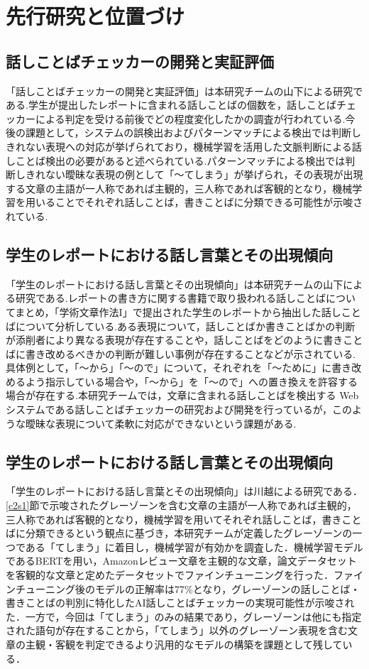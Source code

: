 \chapter{先行研究と位置づけ\label{c2}}

\section{話しことばチェッカーの開発と実証評価 \label{c2s1}}
「話しことばチェッカーの開発と実証評価」は本研究チームの山下による研究である.学生が提出したレポートに含まれる話しことばの個数を，話しことばチェッカーによる判定を受ける前後でどの程度変化したかの調査が行われている.今後の課題として，システムの誤検出およびパターンマッチによる検出では判断しきれない表現への対応が挙げられており，機械学習を活用した文脈判断による話しことば検出の必要があると述べられている.パターンマッチによる検出では判断しきれない曖昧な表現の例として「～てしまう」が挙げられ，その表現が出現する文章の主語が一人称であれば主観的，三人称であれば客観的となり，機械学習を用いることでそれぞれ話しことば，書きことばに分類できる可能性が示唆されている.

\section{学生のレポートにおける話し言葉とその出現傾向 \label{c2s2}}
「学生のレポートにおける話し言葉とその出現傾向」は本研究チームの山下による研究である.レポートの書き方に関する書籍で取り扱われる話しことばについてまとめ，「学術文章作法I」で提出された学生のレポートから抽出した話しことばについて分析している.ある表現について，話しことばか書きことばかの判断が添削者により異なる表現が存在することや，話しことばをどのように書きことばに書き改めるべきかの判断が難しい事例が存在することなどが示されている.具体例として，「～から」「～ので」について，それぞれを「～ために」に書き改めるよう指示している場合や，「～から」を「～ので」への置き換えを許容する場合が存在する.本研究チームでは，文章に含まれる話しことばを検出する Web システムである話しことばチェッカーの研究および開発を行っているが，このような曖昧な表現について柔軟に対応ができないという課題がある.

\section{学生のレポートにおける話し言葉とその出現傾向 \label{c2s3}}
「学生のレポートにおける話し言葉とその出現傾向」\cite{ai-checker}は川越による研究である．\ref{c2s1}節で示唆されたグレーゾーンを含む文章の主語が一人称であれば主観的，三人称であれば客観的となり，機械学習を用いてそれぞれ話しことば，書きことばに分類できるという観点に基づき，本研究チームが定義したグレーゾーンの一つである「てしまう」に着目し，機械学習が有効かを調査した．機械学習モデルであるBERTを用い，Amazonレビュー文章を主観的な文章，論文データセットを客観的な文章と定めたデータセットでファインチューニングを行った．ファインチューニング後のモデルの正解率は77\%となり，グレーゾーンの話しことば・書きことばの判別に特化したAI話しことばチェッカーの実現可能性が示唆された．一方で，今回は「てしまう」のみの結果であり，グレーゾーンは他にも指定された語句が存在することから，「てしまう」以外のグレーゾーン表現を含む文章の主観・客観を判定できるより汎用的なモデルの構築を課題として残している．

